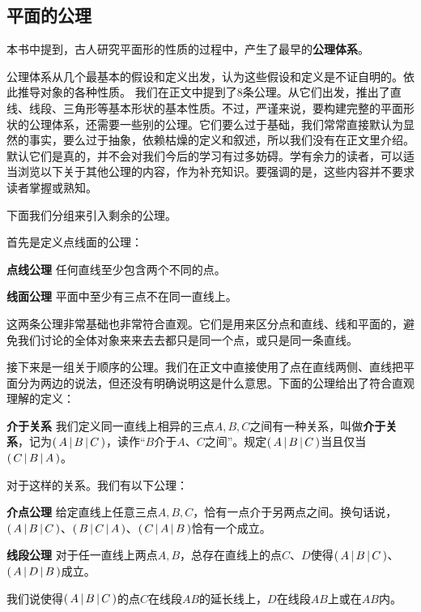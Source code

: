 \documentclass[12pt,UTF8,fontset=none]{ctexbook}
\begin{document}
\begin{appendix}

\chapter{平面的公理}
本书中提到，古人研究平面形的性质的过程中，产生了最早的\textbf{公理体系}。

公理体系从几个最基本的假设和定义出发，认为这些假设和定义是不证自明的。依此推导对象的各种性质。
我们在正文中提到了$8$条公理。从它们出发，推出了直线、线段、三角形等基本形状的基本性质。不过，严谨来说，要构建完整的平面形状的公理体系，还需要一些别的公理。它们要么过于基础，我们常常直接默认为显然的事实，要么过于抽象，依赖枯燥的定义和叙述，所以我们没有在正文里介绍。默认它们是真的，并不会对我们今后的学习有过多妨碍。学有余力的读者，可以适当浏览以下关于其他公理的内容，作为补充知识。要强调的是，这些内容并不要求读者掌握或熟知。

下面我们分组来引入剩余的公理。

首先是定义点线面的公理：
\begin{po}{\textbf{点线公理}}\label{po:1-0}
    任何直线至少包含两个不同的点。
\end{po}
\begin{po}{\textbf{线面公理}}\label{po:1-1}
    平面中至少有三点不在同一直线上。
\end{po}
这两条公理非常基础也非常符合直观。它们是用来区分点和直线、线和平面的，避免我们讨论的全体对象来来去去都只是同一个点，或只是同一条直线。

接下来是一组关于顺序的公理。我们在正文中直接使用了点在直线两侧、直线把平面分为两边的说法，但还没有明确说明这是什么意思。下面的公理给出了符合直观理解的定义：
\begin{df}{\textbf{介于关系}}\label{df:a-0}
    我们定义同一直线上相异的三点$A,B,C$之间有一种关系，叫做\textbf{介于关系}，记为$\displaystyle\left( \,A \,\middle\vert \,B\,\middle\vert \,C \,\right)$，读作“$B$介于$A$、$C$之间”。规定$\displaystyle\left( \,A \,\middle\vert \,B\,\middle\vert \,C \,\right)$当且仅当$\displaystyle\left( \,C \,\middle\vert \,B\,\middle\vert \,A \,\right)$。
\end{df}
对于这样的关系。我们有以下公理：
\begin{po}{\textbf{介点公理}}\label{po:1-2}
    给定直线上任意三点$A,B,C$，恰有一点介于另两点之间。换句话说，$\displaystyle\left( \,A \,\middle\vert \,B\,\middle\vert \,C \,\right)$、$\displaystyle\left( \,B \,\middle\vert \,C\,\middle\vert \,A \,\right)$、$\displaystyle\left( \,C \,\middle\vert \,A\,\middle\vert \,B \,\right)$恰有一个成立。
\end{po}
\begin{po}{\textbf{线段公理}}\label{po:1-3}
    对于任一直线上两点$A,B$，总存在直线上的点$C$、$D$使得$\displaystyle\left( \,A \,\middle\vert \,B\,\middle\vert \,C \,\right)$、$\displaystyle\left( \,A \,\middle\vert \,D\,\middle\vert \,B \,\right)$成立。
\end{po}
我们说使得$\displaystyle\left( \,A \,\middle\vert \,B\,\middle\vert \,C \,\right)$的点$C$在线段$AB$的延长线上，$D$在线段$AB$上或在$AB$内。


\end{appendix}
\end{document}
